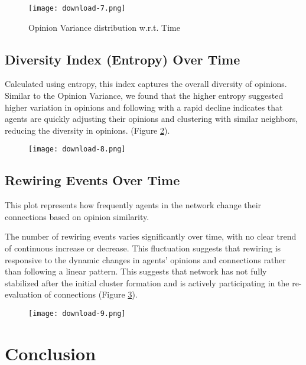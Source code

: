 \documentclass{article} %
\begin{document}
\begin{figure}[h]
    \centering
    \texttt{[image: download-7.png]}
    \caption{Opinion Variance distribution w.r.t. Time}
    \label{fig:opiniondist}
\end{figure}

\subsection{Diversity Index (Entropy) Over Time}
Calculated using entropy, this index captures the overall diversity of opinions. Similar to the Opinion Variance, we found that the higher entropy suggested higher variation in opinions and following with a rapid decline indicates that agents are quickly adjusting their opinions and clustering with similar neighbors, reducing the diversity in opinions. (Figure \ref{fig:opiniondiversity}).

\begin{figure}[h]
    \centering
    \texttt{[image: download-8.png]}
    \label{fig:opiniondiversity}
\end{figure}


\subsection{Rewiring Events Over Time}
This plot represents how frequently agents in the network change their connections based on opinion similarity.

The number of rewiring events varies significantly over time, with no clear trend of continuous increase or decrease. This fluctuation suggests that rewiring is responsive to the dynamic changes in agents' opinions and connections rather than following a linear pattern. This suggests that network has not fully stabilized after the initial cluster formation and is actively participating in the re-evaluation of connections (Figure \ref{fig:clusterdist}).

\begin{figure}[h]
    \centering
    \texttt{[image: download-9.png]}
    \label{fig:clusterdist}
\end{figure}

\section{Conclusion}
\end{document}
